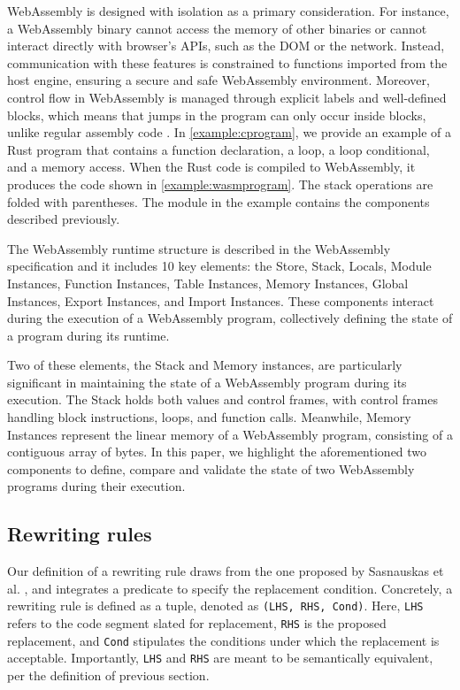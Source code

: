 \documentclass[a4paper,fleqn]{cas-dc}
\newcommand*\badge[1]{ \colorbox{red}{\color{white}#1}}
\newcommand{\todo}[1]{%
\refstepcounter{todo}
\noindent\textbf{\badge{TODO}} {\color{red}#1}
\addcontentsline{td}{todo}
{\color{red}\thesection.\thetodo\xspace #1}}
\begin{document}
WebAssembly is designed with isolation as a primary consideration. For instance, a WebAssembly binary cannot access the memory of other binaries or cannot interact directly with browser's APIs, such as the DOM or the network. Instead, communication with these features is constrained to functions imported from the host engine, ensuring a secure and safe WebAssembly environment.
Moreover, control flow in WebAssembly is managed through explicit labels and well-defined blocks, which means that jumps in the program can only occur inside blocks, unlike regular assembly code \cite{10.1145/3062341.3062363}. 
In \autoref{example:cprogram}, we provide an example of a Rust program that contains a function declaration, a loop, a loop conditional, and a memory access. When the Rust code is compiled to WebAssembly, it produces the code shown in \autoref{example:wasmprogram}. The stack operations are folded with parentheses.
The module in the example contains the components described previously.


The WebAssembly runtime structure is described in the WebAssembly specification and it includes 10 key elements: the Store, Stack, Locals, Module Instances, Function Instances, Table Instances, Memory Instances, Global Instances, Export Instances, and Import Instances. These components interact during the execution of a WebAssembly program, collectively defining the state of a program during its runtime.

Two of these elements, the Stack and Memory instances, are particularly significant in maintaining the state of a WebAssembly program during its execution. The Stack holds both values and control frames, with control frames handling block instructions, loops, and function calls. Meanwhile, Memory Instances represent the linear memory of a WebAssembly program, consisting of a contiguous array of bytes.
In this paper, we highlight the aforementioned two components to define, compare and validate the state of two WebAssembly programs during their execution. 


\subsection{Rewriting rules}
\label{rewriting}

Our definition of a rewriting rule draws from the one proposed by Sasnauskas et al. \cite{2017arXiv171104422S}, and integrates a predicate to specify the replacement condition.
Concretely, a rewriting rule is defined as a tuple, denoted as \texttt{(LHS, RHS, Cond)}. Here, \texttt{LHS} refers to the code segment slated for replacement, \texttt{RHS} is the proposed replacement, and \texttt{Cond} stipulates the conditions under which the replacement is acceptable.
Importantly, \texttt{LHS} and \texttt{RHS} are meant to be semantically equivalent, per the definition of previous section.
\end{document}
